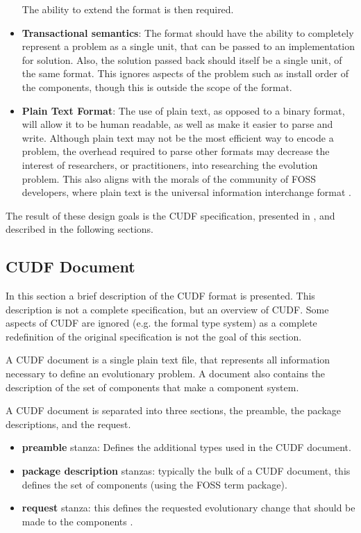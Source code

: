 \begin{itemize}
  The ability to extend the format is then required.
  \item \textbf{Transactional semantics}:
  The format should have the ability to completely represent a problem as a single unit, that can be passed to an implementation for solution.
  Also, the solution passed back should itself be a single unit, of the same format.
  This ignores aspects of the problem such as install order of the components, though this is outside the scope of the format.
  \item \textbf{Plain Text Format}:
  The use of plain text, as opposed to a binary format, will allow it to be human readable, as well as make it easier to parse and write.
  Although plain text may not be the most efficient way to encode a problem, 
  the overhead required to parse other formats may decrease the interest of researchers, or practitioners, into researching the evolution problem.
  This also aligns with the morals of the community of FOSS developers, where plain text is the universal information interchange format \citep{raymond2003art}.
\end{itemize}

The result of these design goals is the CUDF specification, presented in \citep{treinen2009common}, and described in the following sections.

\subsection{CUDF Document}
In this section a brief description of the CUDF format is presented.
This description is not a complete specification, but an overview of CUDF.
Some aspects of CUDF are ignored (e.g. the formal type system) as a complete redefinition of the original specification is not the goal of this section.

A CUDF document is a single plain text file, that represents all information necessary to define an evolutionary problem.
A document also contains the description of the set of components that make a component system.

A CUDF document is separated into three sections, the preamble, the package descriptions, and the request.

\begin{itemize}
  \item \textbf{preamble} stanza: Defines the additional types used in the CUDF document.
  \item \textbf{package description} stanzas: typically the bulk of a CUDF document, this defines the set of components (using the FOSS term package).
  \item \textbf{request} stanza: this defines the requested evolutionary change that should be made to the components .
\end{itemize}

